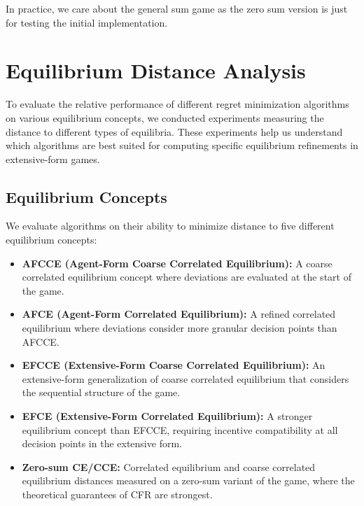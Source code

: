 \documentclass[11pt]{article}
\begin{document}
In practice, we care about the general sum game as the zero sum version is just for testing the initial implementation.

















\newpage

\section{Equilibrium Distance Analysis}

To evaluate the relative performance of different regret minimization algorithms on various equilibrium concepts, we conducted experiments measuring the distance to different types of equilibria. These experiments help us understand which algorithms are best suited for computing specific equilibrium refinements in extensive-form games.

\subsection{Equilibrium Concepts}

We evaluate algorithms on their ability to minimize distance to five different equilibrium concepts:

\begin{itemize}
    \item \textbf{AFCCE (Agent-Form Coarse Correlated Equilibrium):} A coarse correlated equilibrium concept where deviations are evaluated at the start of the game.

    \item \textbf{AFCE (Agent-Form Correlated Equilibrium):} A refined correlated equilibrium where deviations consider more granular decision points than AFCCE.

    \item \textbf{EFCCE (Extensive-Form Coarse Correlated Equilibrium):} An extensive-form generalization of coarse correlated equilibrium that considers the sequential structure of the game.

    \item \textbf{EFCE (Extensive-Form Correlated Equilibrium):} A stronger equilibrium concept than EFCCE, requiring incentive compatibility at all decision points in the extensive form.

    \item \textbf{Zero-sum CE/CCE:} Correlated equilibrium and coarse correlated equilibrium distances measured on a zero-sum variant of the game, where the theoretical guarantees of CFR are strongest.
\end{itemize}
\end{document}

